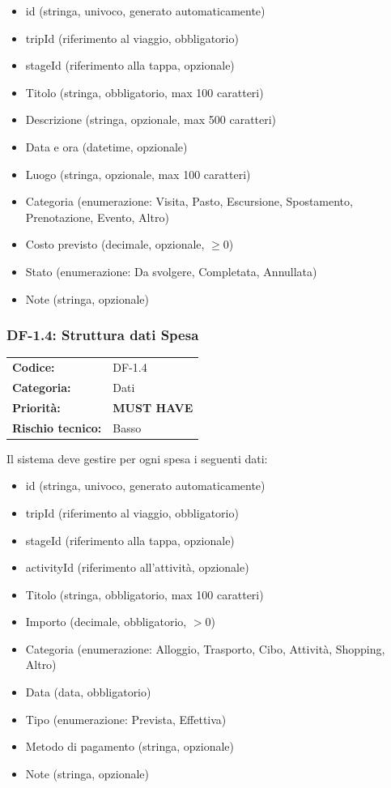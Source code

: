 \documentclass[12pt, a4paper]{article}
\newcommand{\MUST}{\colorbox{musthave}{\small\textbf{MUST HAVE}}}
\newcommand{\RISKL}{\colorbox{risklow}{\small Basso}}
\begin{document}
\begin{itemize}[leftmargin=1.5em, itemsep=1pt]
  \item id (stringa, univoco, generato automaticamente)
  \item tripId (riferimento al viaggio, obbligatorio)
  \item stageId (riferimento alla tappa, opzionale)
  \item Titolo (stringa, obbligatorio, max 100 caratteri)
  \item Descrizione (stringa, opzionale, max 500 caratteri)
  \item Data e ora (datetime, opzionale)
  \item Luogo (stringa, opzionale, max 100 caratteri)
  \item Categoria (enumerazione: Visita, Pasto, Escursione, Spostamento, Prenotazione, Evento, Altro)
  \item Costo previsto (decimale, opzionale, \(\geq 0\))
  \item Stato (enumerazione: Da svolgere, Completata, Annullata)
  \item Note (stringa, opzionale)
\end{itemize}

\subsubsection{DF-1.4: Struttura dati Spesa}

\begin{tabular}{@{}ll@{}}
  \toprule
  \textbf{Codice:}          & DF-1.4 \\
  \textbf{Categoria:}       & Dati \\
  \textbf{Priorità:}        & \MUST \\
  \textbf{Rischio tecnico:} & \RISKL \\
  \bottomrule
\end{tabular}

\medskip
\noindent
Il sistema deve gestire per ogni spesa i seguenti dati:

\begin{itemize}[leftmargin=1.5em, itemsep=1pt]
  \item id (stringa, univoco, generato automaticamente)
  \item tripId (riferimento al viaggio, obbligatorio)
  \item stageId (riferimento alla tappa, opzionale)
  \item activityId (riferimento all'attività, opzionale)
  \item Titolo (stringa, obbligatorio, max 100 caratteri)
  \item Importo (decimale, obbligatorio, \(> 0\))
  \item Categoria (enumerazione: Alloggio, Trasporto, Cibo, Attività, Shopping, Altro)
  \item Data (data, obbligatorio)
  \item Tipo (enumerazione: Prevista, Effettiva)
  \item Metodo di pagamento (stringa, opzionale)
  \item Note (stringa, opzionale)
\end{itemize}
\end{document}
